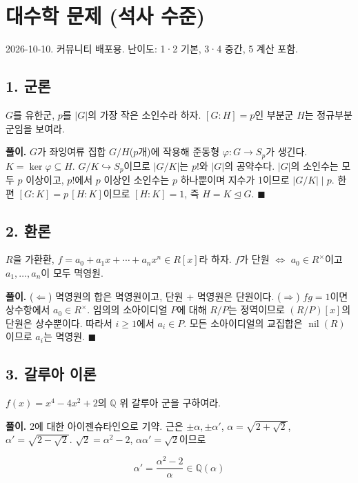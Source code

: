 \section{대수학 문제 (석사 수준)}

2026-10-10. 커뮤니티 배포용. 난이도: 1·2 기본, 3·4 중간, 5 계산 포함.

\subsection{1. 군론}

\(G\)를 유한군, \(p\)를 \(|G|\)의 가장 작은 소인수라 하자. \([G:H]=p\)인
부분군 \(H\)는 정규부분군임을 보여라.

\textbf{풀이.} \(G\)가 좌잉여류 집합 \(G/H\)(\(p\)개)에 작용해 준동형
\(\varphi:G\to S_p\)가 생긴다. \(K=\ker\varphi\subseteq H\).
\(G/K\hookrightarrow S_p\)이므로 \(|G/K|\)는 \(p!\)와 \(|G|\)의
공약수다. \(|G|\)의 소인수는 모두 \(p\) 이상이고, \(p!\)에서 \(p\)
이상인 소인수는 \(p\) 하나뿐이며 지수가 1이므로 \(|G/K|\mid p\). 한편
\([G:K]=p\,[H:K]\)이므로 \([H:K]=1\), 즉 \(H=K\trianglelefteq G\).
\(\blacksquare\)

\subsection{2. 환론}

\(R\)을 가환환, \(f=a_0+a_1x+\cdots+a_nx^n\in R[x]\)라 하자. \(f\)가
단원 \(\iff\) \(a_0\in R^\times\)이고 \(a_1,\dots,a_n\)이 모두 멱영원.

\textbf{풀이.} (\(\Leftarrow\)) 멱영원의 합은 멱영원이고, 단원 +
멱영원은 단원이다. (\(\Rightarrow\)) \(fg=1\)이면 상수항에서
\(a_0\in R^\times\). 임의의 소아이디얼 \(P\)에 대해 \(R/P\)는 정역이므로
\((R/P)[x]\)의 단원은 상수뿐이다. 따라서 \(i\ge1\)에서 \(a_i\in P\).
모든 소아이디얼의 교집합은 \(\operatorname{nil}(R)\)이므로 \(a_i\)는
멱영원. \(\blacksquare\)

\subsection{3. 갈루아 이론}

\(f(x)=x^4-4x^2+2\)의 \(\mathbb Q\) 위 갈루아 군을 구하여라.

\textbf{풀이.} 2에 대한 아이젠슈타인으로 기약. 근은
\(\pm\alpha,\pm\alpha'\), \(\alpha=\sqrt{2+\sqrt2}\),
\(\alpha'=\sqrt{2-\sqrt2}\). \(\sqrt2=\alpha^2-2\),
\(\alpha\alpha'=\sqrt2\)이므로

\[
\alpha'=\frac{\alpha^2-2}{\alpha}\in\mathbb Q(\alpha)
\]

